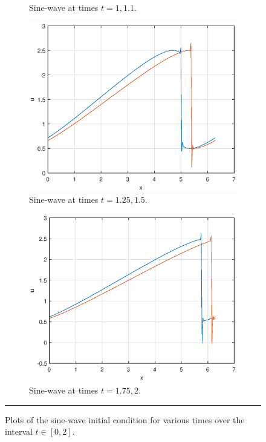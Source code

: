 \documentclass[a4paper, 12pt]{article}
\begin{document}
\begin{figure}[H]
\begin{subfigure}[b]{0.5\textwidth}
\caption{Sine-wave at times $t=1,1.1$.}%
\end{subfigure}
\begin{subfigure}[b]{0.5\textwidth}
\includegraphics[width=\textwidth]{Q3sine_t=15}\hfill
\caption{Sine-wave at times $t=1.25,1.5$.}%
\end{subfigure}
\begin{subfigure}[b]{0.5\textwidth}
\includegraphics[width=\textwidth]{Q3sine_t=2}\hfill
\caption{Sine-wave at times $t=1.75,2$.}%
\end{subfigure}
\caption{Plots of the sine-wave initial condition for various times over the interval $t\in[0,2]$.}
\rule{\linewidth}{.4pt}
\end{figure}
\end{document}
